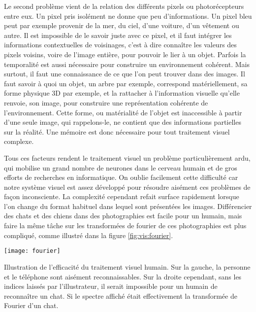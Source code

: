 	Le second problème vient de la relation des différents pixels ou photorécepteurs entre eux. Un pixel pris isolément ne donne que peu d'informations. Un pixel bleu peut par exemple provenir de la mer, du ciel, d'une voiture, d'un vêtement ou autre. Il est impossible de le savoir juste avec ce pixel, et il faut intégrer les informations contextuelles de voisinages, c'est à dire connaître les valeurs des pixels voisins, voire de l'image entière, pour pouvoir le lier à un objet. Parfois la temporalité est aussi nécessaire pour construire un environnement cohérent. Mais surtout, il faut une connaissance de ce que l'on peut trouver dans des images. Il faut savoir à quoi un objet, un arbre par exemple, correspond matériellement, sa forme physique 3D par exemple, et la rattacher à l'information visuelle qu'elle renvoie, son image, pour construire une représentation cohérente de l'environnement. Cette forme, ou matérialité de l'objet est inaccessible à partir d'une seule image, qui rappelons-le, ne contient que des informations partielles sur la réalité. Une mémoire est donc nécessaire pour tout traitement visuel complexe.

	Tous ces facteurs rendent le traitement visuel un problème particulièrement ardu, qui mobilise un grand nombre de neurones dans le cerveau humain et de gros efforts de recherches en informatique. On oublie facilement cette difficulté car notre système visuel est assez développé pour résoudre aisément ces problèmes de façon inconsciente. La complexité cependant refait surface rapidement lorsque l'on change du format habituel dans lequel sont présentées les images. Différencier des chats et des chiens dans des photographies est facile pour un humain, mais faire la même tâche sur les transformées de fourier de ces photographies est plus compliqué, comme illustré dans la figure \ref{fig:vis:fourier}.

	\begin{figureth}
		\texttt{[image: fourier]}
		\caption[Illustration de l'efficacité du traitement visuel humain.]{Illustration de l'efficacité du traitement visuel humain. Sur la gauche, la personne et le téléphone sont aisément reconnaissables. Sur la droite cependant, sans les indices laissés par l'illustrateur, il serait impossible pour un humain de reconnaître un chat. Si le spectre affiché était effectivement la transformée de Fourier d'un chat.\footnotemark}\label{fig:vis:fourier}
	\end{figureth}


